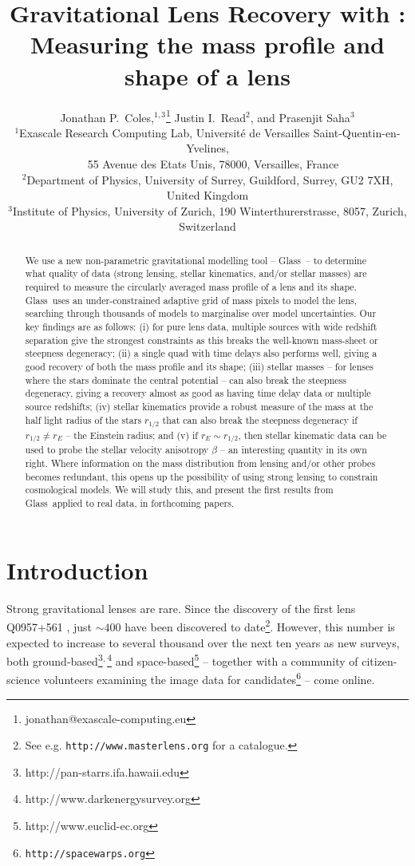 \documentclass[galley,usenatbib]{mn2e}
\title[Lens Recovery with \Glass]{Gravitational Lens Recovery with \Glass: Measuring the mass profile and shape of a lens}
\author[J.~P.~Coles~et~al.]{%
Jonathan P.~Coles,$^{1,3}$\thanks{jonathan@exascale-computing.eu}%
\newauthor%
Justin I.~Read$^2$,%
\newauthor%
and Prasenjit Saha$^3$%
%
\\
$^1$Exascale Research Computing Lab, Universit\'e de Versailles Saint-Quentin-en-Yvelines,\\$\quad$55 Avenue des Etats Unis, 78000, Versailles, France\\
$^2$Department of Physics, University of Surrey, Guildford, Surrey, GU2 7XH, United Kingdom \\
$^3$Institute of Physics, University of Zurich, 190 Winterthurerstrasse, 8057, Zurich, Switzerland
}
\newcommand{\Glass}{{\sc Glass}}
\begin{document}
\maketitle

\begin{abstract}
We use a new non-parametric gravitational modelling tool -- \Glass\ -- to
determine what quality of data (strong lensing, stellar kinematics, and/or
stellar masses) are required to measure the circularly averaged mass profile of
a lens and its shape. \Glass\ uses an under-constrained adaptive grid of mass
pixels to model the lens, searching through thousands of models to marginalise
over model uncertainties. Our key findings are as follows: (i) for pure lens
data, multiple sources with wide redshift separation give the strongest
constraints as this breaks the well-known mass-sheet or steepness degeneracy;
(ii) a single quad with time delays also performs well, giving a good recovery
of both the mass profile and its shape; (iii) stellar masses -- for lenses
where the stars dominate the central potential -- can also break the steepness
degeneracy, giving a recovery almost as good as having time delay data or
multiple source redshifts; (iv) stellar kinematics provide a robust measure of the mass at the half light radius of the stars $r_{1/2}$ that can also break the steepness degeneracy if $r_{1/2} \neq r_E$ -- the Einstein radius; and (v) if $r_E \sim r_{1/2}$, then stellar kinematic data can be used to probe the stellar velocity anisotropy 
$\beta$ -- an interesting quantity in its own right. Where
information on the mass distribution from lensing and/or other probes becomes
redundant, this opens up the possibility of using strong lensing to constrain
cosmological models. We will study this, and present the first results from
\Glass\ applied to real data, in forthcoming papers.
\end{abstract}

\section{Introduction}\label{sec:intro}

Strong gravitational lenses are rare. Since the discovery of the first lens Q0957+561 \citep{1979Natur.279..381W}, just $\sim400$ have been discovered to date\footnote{See e.g. {\tt http://www.masterlens.org} for a catalogue.}. However, this number is expected to increase to
several thousand over the next ten years as new surveys, both
ground-based\footnote{http://pan-starrs.ifa.hawaii.edu}$^{\rm,}$\footnote{http://www.darkenergysurvey.org}
and space-based\footnote{http://www.euclid-ec.org} -- together with a
community of citizen-science volunteers examining the image data for
candidates\footnote{{\tt http://spacewarps.org}} -- come online. 
\end{document}
